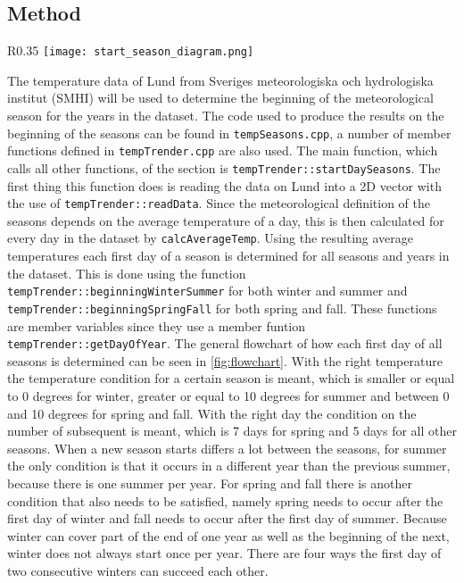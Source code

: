 \subsection{Method}

\begin{wrapfigure}{R}{0.35\textwidth}
\texttt{[image: start\_season\_diagram.png]}
\caption{The code used for the calculation of the start of a season represented in a flowchart.}
\label{fig:flowchart}
\end{wrapfigure}

The temperature data of Lund from Sveriges meteorologiska och hydrologiska institut (SMHI) will be used to determine the beginning of the meteorological season for the years in the dataset.  The code used to produce the results on the beginning of the seasons can be found in \texttt{tempSeasons.cpp}, a number of member functions defined in \texttt{tempTrender.cpp} are also used.  The main function, which calls all other functions, of the section is \texttt{tempTrender::startDaySeasons}.  The first thing this function does is reading the data on Lund into a 2D vector with the use of \texttt{tempTrender::readData}. Since the meteorological definition of the seasons depends on the average temperature of a day, this is then calculated for every day in the dataset by  \texttt{calcAverageTemp}. Using the resulting average temperatures each first day of a season is determined for all seasons and years in the dataset. This is done using the function \texttt{tempTrender::beginningWinterSummer} for both winter and summer and \texttt{tempTrender::beginningSpringFall} for both spring and fall. These functions are member variables since they use a member funtion \texttt{tempTrender::getDayOfYear}. The general flowchart of how each first day of all seasons is determined can be seen in \ref{fig:flowchart}. With the right temperature the temperature condition for a certain season is meant, which is smaller or equal to 0 degrees for winter, greater or equal to 10 degrees for summer and between 0 and 10 degrees for spring and fall. With the right day the condition on the number of subsequent is meant, which is 7 days for spring and 5 days for all other seasons. When a new season starts differs a lot between the seasons, for summer the only condition is that it occurs in a different year than the previous summer, because there is one summer per year. For spring and fall there is another condition that also needs to be satisfied, namely spring needs to occur after the first day of winter and fall needs to occur after the first day of summer. Because winter can cover part of the end of one year as well as the beginning of the next, winter does not always start once per year. There are four ways the first day of two consecutive winters can succeed each other. 

